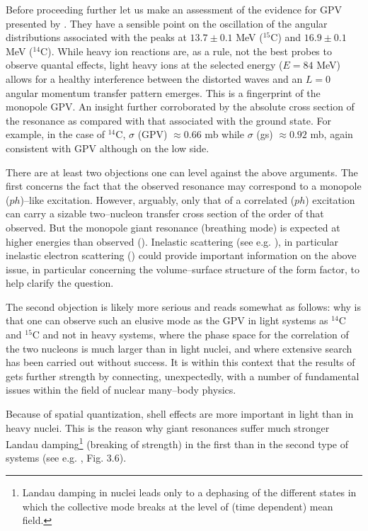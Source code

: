 \documentclass[a4paper,11pt]{article}
\numberwithin{equation}{section}
\numberwithin{figure}{section}
\numberwithin{table}{section}
\begin{document}
Before proceeding further let us make an assessment of the evidence for GPV presented by \cite{Cappuzzello:15}. They have a sensible point on the oscillation of the angular distributions associated with the peaks at $13.7\pm0.1$ MeV ($^{15}$C) and $16.9\pm0.1$ MeV ($^{14}$C). While heavy ion reactions are, as a rule, not the best probes to observe quantal effects, light heavy ions at the selected energy ($E=84$ MeV) allows for a healthy interference between the distorted waves and an $L=0$ angular momentum transfer pattern emerges. This is a fingerprint of the monopole GPV. An insight further corroborated by the absolute cross section of the resonance as compared with that associated with the ground state. For example, in the case of $^{14}$C, $\sigma$ (GPV) $\approx 0.66$ mb while $\sigma$ (gs) $\approx 0.92$ mb, again consistent with GPV although on the low side.

There are at least two objections one can level against the above arguments. The first concerns the fact that the observed resonance may correspond to a monopole ($ph$)--like excitation. However, arguably, only that of a correlated ($ph$) excitation can carry a sizable two--nucleon transfer cross section of the order of that observed. But the monopole giant resonance (breathing mode) is expected at higher energies than observed (\cite{Lebrun:80}). Inelastic scattering (see e.g. \cite{Bortignon:98}), in particular inelastic electron scattering (\cite{Wakasugi:13}) could provide important information on the above issue, in particular concerning the volume--surface structure of the form factor, to help clarify the question.


The second objection is likely more serious and reads somewhat as follows: why is that one can observe such an elusive mode as the GPV in light systems as $^{14}$C and $^{15}$C and not in heavy systems, where the phase space for the correlation of the two nucleons is much larger than in light nuclei, and where extensive search has been carried out without success. It is within this context that the results of \cite{Cappuzzello:15} gets further strength by connecting, unexpectedly, with a number of fundamental issues within the field of nuclear many--body physics.


Because of spatial quantization, shell effects are more important in light than in heavy nuclei. This is the reason why giant resonances suffer much stronger Landau damping\footnote{Landau damping in nuclei leads only to a dephasing of the different states in which the collective mode breaks at the level of (time dependent) mean field.} (breaking of strength) in the first than in the second type of systems (see e.g. \cite{Bortignon:98}, Fig. 3.6).
\end{document}
